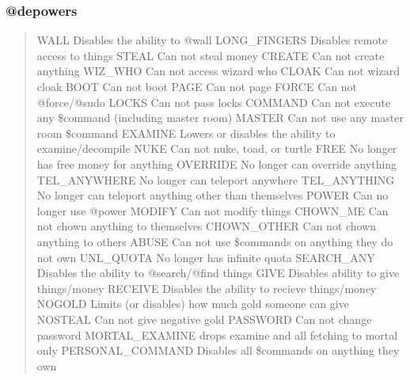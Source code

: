 \documentclass[letterpaper,10pt,english]{sphinxmanual}
\begin{document}
\subsubsection{@depowers}
\label{\detokenize{security:depowers}}\begin{quote}

\sphinxAtStartPar
WALL               \sphinxhyphen{} Disables the ability to @wall
LONG\_FINGERS       \sphinxhyphen{} Disables remote access to things
STEAL              \sphinxhyphen{} Can not steal money
CREATE             \sphinxhyphen{} Can not create anything
WIZ\_WHO            \sphinxhyphen{} Can not access wizard who
CLOAK              \sphinxhyphen{} Can not wizard cloak
BOOT               \sphinxhyphen{} Can not boot
PAGE               \sphinxhyphen{} Can not page
FORCE              \sphinxhyphen{} Can not @force/@sudo
LOCKS              \sphinxhyphen{} Can not pass locks
COMMAND            \sphinxhyphen{} Can not execute any \$command (including master room)
MASTER             \sphinxhyphen{} Can not use any master room \$command
EXAMINE            \sphinxhyphen{} Lowers or disables the ability to examine/decompile
NUKE               \sphinxhyphen{} Can not nuke, toad, or turtle
FREE               \sphinxhyphen{} No longer has free money for anything
OVERRIDE           \sphinxhyphen{} No longer can override anything
TEL\_ANYWHERE       \sphinxhyphen{} No longer can teleport anywhere
TEL\_ANYTHING       \sphinxhyphen{} No longer can teleport anything other than themselves
POWER              \sphinxhyphen{} Can no longer use @power
MODIFY             \sphinxhyphen{} Can not modify things
CHOWN\_ME           \sphinxhyphen{} Can not chown anything to themselves
CHOWN\_OTHER        \sphinxhyphen{} Can not chown anything to others
ABUSE              \sphinxhyphen{} Can not use \$commands on anything they do not own
UNL\_QUOTA          \sphinxhyphen{} No longer has infinite quota
SEARCH\_ANY         \sphinxhyphen{} Disables the ability to @search/@find things
GIVE               \sphinxhyphen{} Disables ability to give things/money
RECEIVE            \sphinxhyphen{} Disables the ability to recieve things/money
NOGOLD             \sphinxhyphen{} Limits (or disables) how much gold someone can give
NOSTEAL            \sphinxhyphen{} Can not give negative gold
PASSWORD           \sphinxhyphen{} Can not change password
MORTAL\_EXAMINE     \sphinxhyphen{} drops examine and all fetching to mortal only
PERSONAL\_COMMAND   \sphinxhyphen{} Disables all \$commands on anything they own
\end{quote}
\end{document}
